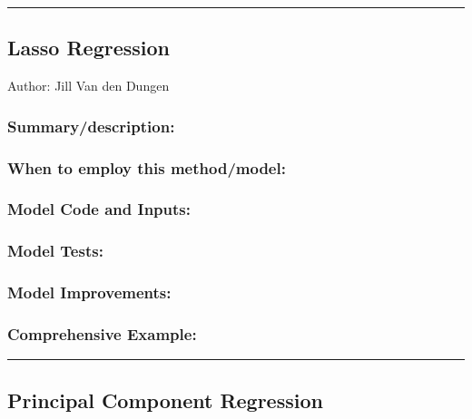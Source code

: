 \documentclass[
]{article}
\begin{document}
\begin{center}\rule{0.5\linewidth}{0.5pt}\end{center}

\hypertarget{lasso-regression}{%
\subsection{Lasso Regression}\label{lasso-regression}}

Author: Jill Van den Dungen

\hypertarget{summarydescription-2}{%
\subsubsection{Summary/description:}\label{summarydescription-2}}

\hypertarget{when-to-employ-this-methodmodel-2}{%
\subsubsection{When to employ this
method/model:}\label{when-to-employ-this-methodmodel-2}}

\hypertarget{model-code-and-inputs-2}{%
\subsubsection{Model Code and Inputs:}\label{model-code-and-inputs-2}}

\hypertarget{model-tests-2}{%
\subsubsection{Model Tests:}\label{model-tests-2}}

\hypertarget{model-improvements-2}{%
\subsubsection{Model Improvements:}\label{model-improvements-2}}

\hypertarget{comprehensive-example-2}{%
\subsubsection{Comprehensive Example:}\label{comprehensive-example-2}}

\begin{center}\rule{0.5\linewidth}{0.5pt}\end{center}

\hypertarget{principal-component-regression}{%
\subsection{Principal Component
Regression}\label{principal-component-regression}}
\end{document}
